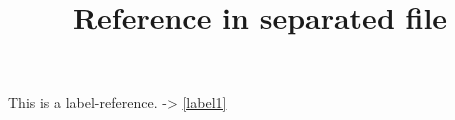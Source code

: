 \documentclass[a4paper,11pt,oneside,openany,report]{jsbook}
\title{Reference in separated file}
\begin{document}
\maketitle
This is a label-reference. -{\textgreater}
\ref{label1}
\end{document}
